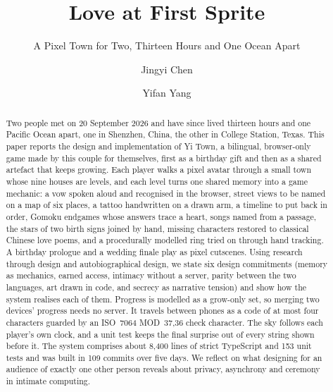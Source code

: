 \documentclass[sigconf,nonacm]{acmart}
\newcommand{\yt}{Yi Town}
\begin{document}
\title{Love at First Sprite}
\subtitle{A Pixel Town for Two, Thirteen Hours and One Ocean Apart}

\author{Jingyi Chen}

\author{Yifan Yang}

\renewcommand{\shortauthors}{J. Chen and Y. Yang}

\begin{abstract}
Two people met on 20 September 2026 and have since lived thirteen hours and one Pacific Ocean
apart, one in Shenzhen, China, the other in College Station, Texas. This paper reports the
design and implementation of \yt{}, a bilingual, browser-only game made by this couple for
themselves, first as a birthday gift and then as a shared artefact that keeps growing. Each
player walks a pixel avatar through a small town whose nine houses are levels, and each level
turns one shared memory into a game mechanic: a vow spoken aloud and recognised in the browser,
street views to be named on a map of six places, a tattoo handwritten on a drawn arm, a timeline
to put back in order, Gomoku endgames whose answers trace a heart, songs named from a passage,
the stars of two birth signs joined by hand, missing characters restored to classical Chinese love
poems, and a procedurally modelled ring tried on through hand tracking. A birthday prologue and a
wedding finale play as pixel cutscenes. Using research through design and autobiographical
design, we state six design commitments (memory as mechanics, earned access, intimacy without a
server, parity between the two languages, art drawn in code, and secrecy as narrative tension)
and show how the system realises each of them. Progress is modelled as a grow-only set, so
merging two devices' progress needs no server. It travels between phones as a code of at most
four characters guarded by an ISO~7064 MOD~37,36 check character. The sky follows each player's
own clock, and a unit test keeps the final surprise out of every string shown before it. The
system comprises about 8{,}400 lines of strict TypeScript and 153 unit tests and was built in 109
commits over five days. We reflect on what designing for an audience of exactly one other person
reveals about privacy, asynchrony and ceremony in intimate computing.
\end{abstract}
\end{document}
